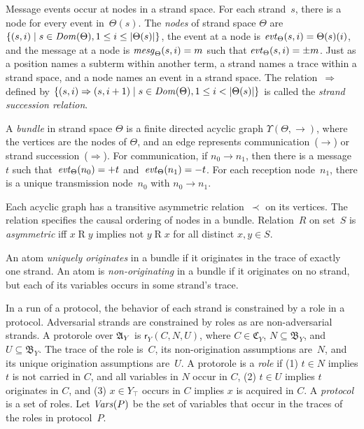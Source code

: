 \documentclass[12pt]{article}
\theoremstyle{definition}
\newcommand{\alga}{\alg{A}}
\newcommand{\tr}{\ensuremath{\mathfrak C}}
\newcommand{\base}{\ensuremath{\mathfrak B}}
\newcommand{\sdom}{\fn{Dom}}
\newcommand{\svars}{\fn{Vars}}
\newcommand{\evt}{\fn{evt}}
\newcommand{\mesg}{\fn{mesg}}
\newcommand{\role}{\mathsf{r}}
\begin{document}
Message events occur at nodes in a strand space.  For each strand~$s$,
there is a node for every event in~$\Theta(s)$.  The \emph{nodes} of
strand space $\Theta$ are $\{(s,i)\mid s\in\sdom(\Theta), 1\leq i\leq
|\Theta(s)|\}$, the event at a node is
$\evt_\Theta(s,i)=\Theta(s)(i)$, and the message at a node is
$\mesg_\Theta(s,i) = m$ such that $\evt_\Theta(s,i) = \pm m$.  Just as
a position names a subterm within another term, a strand names a trace
within a strand space, and a node names an event in a strand space.
The relation~$\Rightarrow$ defined by $\{(s,i)\Rightarrow(s,i+1)\mid
s\in\sdom(\Theta), 1\leq i<|\Theta(s)|\}$ is called the \emph{strand
  succession relation}.

A \emph{bundle} in strand space $\Theta$ is a finite directed
acyclic graph $\Upsilon(\Theta,\to)$, where the vertices are the nodes
of $\Theta$, and an edge represents communication~($\rightarrow$) or
strand succession~($\Rightarrow$).  For communication, if
$n_0\rightarrow n_1$, then there is a message~$t$ such
that~$\evt_\Theta(n_0)=\outbnd t$ and~$\evt_\Theta(n_1)=\inbnd t$.
For each reception node~$n_1$, there is a unique transmission
node~$n_0$ with $n_0\rightarrow n_1$.

Each acyclic graph has a transitive asymmetric relation~$\prec$ on its
vertices.  The relation specifies the causal ordering of nodes in a
bundle.  Relation~$R$ on set~$S$ is \emph{asymmetric} iff
$x\mathbin{R}y$ implies not $y\mathbin{R}x$ for all distinct $x,y \in
S$.

An atom \emph{uniquely originates} in a bundle if it originates in
the trace of exactly one strand.  An atom is \emph{non-originating} in
a bundle if it originates on no strand, but each of its variables
occurs in some strand's trace.

In a run of a protocol, the behavior of each strand is constrained by
a role in a protocol.  Adversarial strands are constrained by roles as
are non-adversarial strands.  A protorole over $\alga_Y$ is
$\role_Y(C,N,U)$, where $C\in\tr_Y$, $N\subseteq\base_Y$, and
$U\subseteq\base_Y$.  The trace of the role is~$C$, its
non-origination assumptions are~$N$, and its unique origination
assumptions are~$U$.  A protorole is a \emph{role} if (1) $t\in N$ implies
$t$ is not carried in $C$, and all variables in $N$ occur in $C$, (2)
$t\in U$ implies $t$ originates in $C$, and (3) $x\in Y_\top$ occurs
in $C$ implies $x$ is acquired in $C$.  A \emph{protocol} is a set of
roles.  Let $\svars(P)$ be the set of variables that occur in the
traces of the roles in protocol~$P$.
\end{document}
